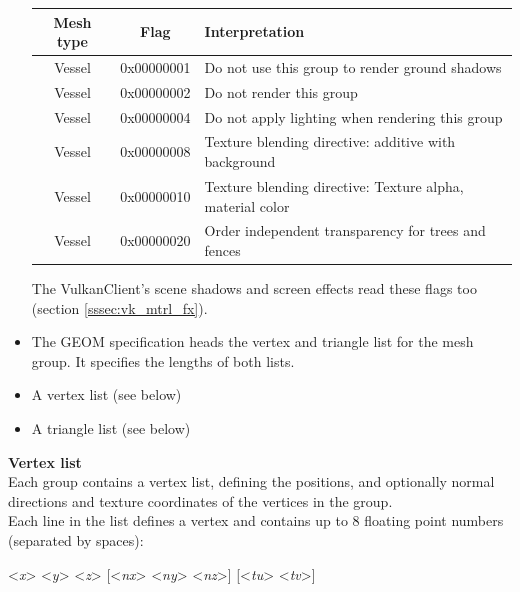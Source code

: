 \documentclass[Orbiter Developer Manual.tex]{subfiles}
\begin{document}
\begin{itemize}
\begin{table}[H]
	\centering
	\begin{tabular}{ |c|c|l| }
	\hline\rule{0pt}{2ex}
	\textbf{Mesh type} & \textbf{Flag} & \textbf{Interpretation} \\
	\hline\rule{0pt}{2ex}
	Vessel & 0x00000001 & Do not use this group to render ground shadows\\
	\hline\rule{0pt}{2ex}
	Vessel & 0x00000002 & Do not render this group\\
	\hline\rule{0pt}{2ex}
	Vessel & 0x00000004 & Do not apply lighting when rendering this group\\
	\hline\rule{0pt}{2ex}
	Vessel & 0x00000008 & Texture blending directive: additive with background\\
	\hline\rule{0pt}{2ex}
	Vessel & 0x00000010 & Texture blending directive: Texture alpha, material color\\
	\hline\rule{0pt}{2ex}
	Vessel & 0x00000020 & Order independent transparency for trees and fences\\
	\hline
	\end{tabular}
\end{table}
The VulkanClient's scene shadows and screen effects read these flags too (section \ref{sssec:vk_mtrl_fx}).

\item The GEOM specification heads the vertex and triangle list for the mesh group. It specifies the lengths of both lists.
\item A vertex list (see below)
\item A triangle list (see below)
\end{itemize}

\noindent
\textbf{Vertex list}\\
Each group contains a vertex list, defining the positions, and optionally normal directions and texture coordinates of the vertices in the group.\\
Each line in the list defines a vertex and contains up to 8 floating point numbers (separated by spaces):

\indent <\textit{x}> <\textit{y}> <\textit{z}> [<\textit{nx}> <\textit{ny}> <\textit{nz}>] [<\textit{tu}> <\textit{tv}>]
\end{document}
